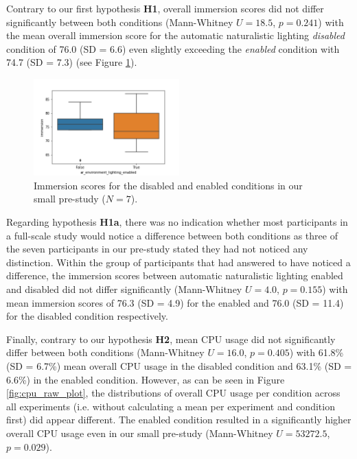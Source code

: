 \documentclass[12pt,twoside,english]{article}
\begin{document}
Contrary to our first hypothesis \textbf{H1}, overall immersion scores did not differ significantly between both conditions (Mann-Whitney $ U = 18.5 $, $ p = 0.241 $) with the mean overall immersion score for the automatic naturalistic lighting \textit{disabled} condition of 76.0 (SD = 6.6) even slightly exceeding the \textit{enabled} condition with 74.7 (SD = 7.3) (see Figure \ref{fig:immersion_plot}).

\begin{figure}[h]
    \centering
    \includegraphics[width=0.5\textwidth]{imgs/immersion_plot}
    \caption{Immersion scores for the disabled and enabled conditions in our small pre-study ($ N = 7 $).}
    \label{fig:immersion_plot}
\end{figure}

Regarding hypothesis \textbf{H1a}, there was no indication whether most participants in a full-scale study would notice a difference between both conditions as three of the seven participants in our pre-study stated they had not noticed any distinction.
Within the group of participants that had answered to have noticed a difference, the immersion scores between automatic naturalistic lighting enabled and disabled did not differ significantly (Mann-Whitney $ U = 4.0 $, $ p = 0.155 $) with mean immersion scores of 76.3 (SD = 4.9) for the enabled and 76.0 (SD = 11.4) for the disabled condition respectively.

Finally, contrary to our hypothesis \textbf{H2}, mean \gls{CPU} usage did not significantly differ between both conditions (Mann-Whitney $ U = 16.0 $, $ p = 0.405 $) with 61.8\% (SD = 6.7\%) mean overall \gls{CPU} usage in the disabled condition and 63.1\% (SD = 6.6\%) in the enabled condition.
However, as can be seen in Figure \ref{fig:cpu_raw_plot}, the distributions of overall \gls{CPU} usage per condition across all experiments (i.e. without calculating a mean per experiment and condition first) did appear different.
The enabled condition resulted in a significantly higher overall \gls{CPU} usage even in our small pre-study (Mann-Whitney $ U = 53272.5 $, $ p = 0.029 $).
\end{document}

